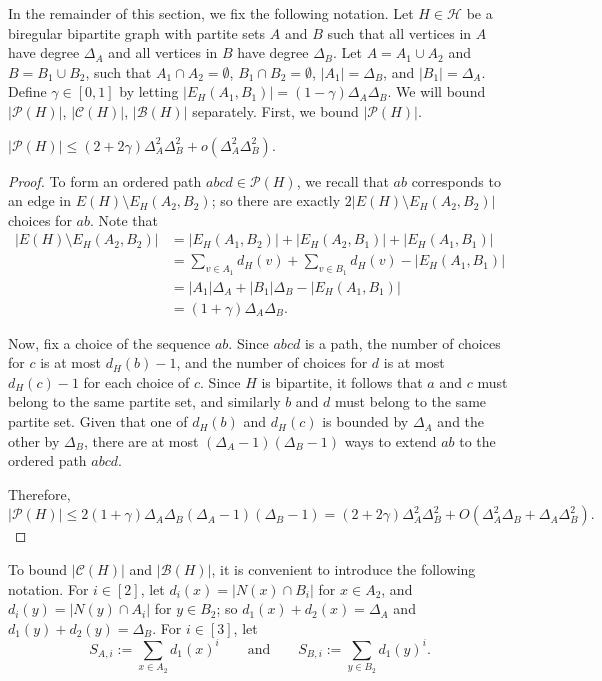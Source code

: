 \documentclass[11pt]{amsart}
\newcommand{\pp}{\mathcal{P}}
\newcommand{\cc}{\mathcal{C}}
\newcommand{\bb}{\mathcal{B}}
\newcommand{\hh}{\mathcal{H}}
\begin{document}
In the remainder of this section, we fix the following notation. Let $H\in \hh$ be a biregular bipartite graph with partite sets $A$ and $B$ such that all vertices in $A$ have degree  $\Delta_A$ and all vertices in $B$ have degree $\Delta_B$. Let $A=A_1 \cup A_2$ and $B=B_1 \cup B_2$, such that $A_1\cap A_2=\emptyset$, $B_1\cap B_2=\emptyset$,  $|A_1| =\Delta_B$, and $|B_1| =\Delta_A$. Define $\gamma\in[0,1]$ by letting $|E_H(A_1,B_1)|=(1-\gamma)\Delta_A\Delta_B$.    We will bound $|\pp(H)|$, $|\cc(H)|$, $|\bb(H)|$ separately. First, we bound $|\pp(H)|$. 
  
\begin{lemma}\label{p(H)}
    $|\pp(H)|\le (2+2\gamma)\Delta_A^2\Delta_B^2 +o(\Delta_A^2\Delta_B^2)$.
\end{lemma}
\begin{proof}
    To form an ordered path $abcd\in \pp(H)$, we recall that $ab$ corresponds to an edge in $E(H)\setminus E_H(A_2,B_2)$; 
    so there are exactly $2|E(H)\setminus E_H(A_2,B_2)|$ choices for $ab$. Note that 
    \begin{align*}
        |E(H)\setminus E_H(A_2,B_2)|& =|E_H(A_1,B_2)|+|E_H(A_2,B_1)|+|E_H(A_1,B_1)|\\
        &=\sum_{v\in A_1}d_H(v)+\sum_{v\in B_1}d_H(v)-|E_H(A_1,B_1)|\\
        &=|A_1|\Delta_A+|B_1|\Delta_B-|E_H(A_1,B_1)|\\
        &=(1+\gamma)\Delta_A\Delta_B. 
        \end{align*}
    
    Now, fix a choice of the sequence $ab$. Since $abcd$ is a path, the number of choices for $c$ is at most $d_H(b)-1$, and the number of choices for $d$ is at most $d_H(c)-1$ for each choice of $c$. Since $H$ is bipartite, it follows that $a$ and $c$ must belong to the same partite set, and similarly $b$ and $d$ must belong to the same partite set. Given that one of $d_H(b)$ and $d_H(c)$  is bounded by $\Delta_A$ and the other by $\Delta_B$, there are at most $(\Delta_A-1)(\Delta_B-1)$ ways to extend $ab$ to the ordered path $abcd$.
    
   Therefore,
    $|\pp(H)|\le 2(1+\gamma)\Delta_A\Delta_B(\Delta_A-1)(\Delta_B-1)=(2+2\gamma)\Delta_A^2\Delta_B^2+O(\Delta_A^2\Delta_B+\Delta_A\Delta_B^2).$
\end{proof}

To bound $|\cc(H)|$ and $|\bb(H)|$, it is convenient to introduce the following notation. For $i\in [2]$,  let $d_i(x)=|N(x)\cap B_i|$ for $x\in A_2$, and $d_i(y)=|N(y)\cap A_i|$ for $y\in B_2$; so $d_1(x)+d_2(x)=\Delta_A$ and $d_1(y)+d_2(y)=\Delta_B$. 
For $i\in [3]$, let \[ S_{A,i}:=\sum_{x\in A_2}d_1(x)^i \qquad\text{and}\qquad S_{B,i}:=\sum_{y\in B_2}d_1(y)^i. \]
\end{document}

